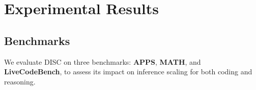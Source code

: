 

\vspace{-0.2cm}  
\section{Experimental Results}
\vspace{-0.2cm}  
\subsection{Benchmarks}
We evaluate DISC on three benchmarks: \textbf{APPS}, \textbf{MATH}, and \textbf{LiveCodeBench}, to assess its impact on inference scaling for both coding and reasoning. 


